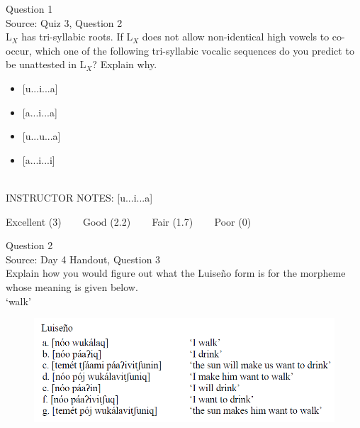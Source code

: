 \documentclass[12pt]{article}
\begin{document}
\begin{center}
\textbf{{\color{violet}{\HUGE Friday, 5 June 2020\\}}}

\textbf{{\color{violet}{\HUGE ALL EXAMS (with notes)\\}}}

\end{center}
\newpage

\begin{center}
\textbf{{\color{blue}{\HUGE START OF EXAM\\}}}

\textbf{{\color{blue}{\HUGE Student ID: 6745\\}}}

\textbf{{\color{blue}{\HUGE 11:30 - 11:45 AM\\}}}

\end{center}
\newpage

{\large Question 1}\\

Source: Quiz 3, Question 2\\

L$_X$ has tri-syllabic roots. If L$_X$ does not allow non-identical high vowels to co-occur, which one of the following tri-syllabic vocalic sequences do you predict to be unattested in L$_X$? Explain why.\\

\begin{itemize} \item {[u...i...a]} \item {[a...i...a]} \item {[u...u...a]} \item {[a...i...i]} \end{itemize}


~\\
INSTRUCTOR NOTES: [u...i...a]


\vfill
Excellent (3) ~~~ Good (2.2) ~~~ Fair (1.7) ~~~ Poor (0)
\newpage

{\large Question 2}\\

Source: Day 4 Handout, Question 3\\

Explain how you would figure out what the Luiseño form is for the morpheme whose meaning is given below.\\

‘walk’

\begin{figure}[H]
\includegraphics{../images/luiseno.png}
\end{figure}
\end{document}

